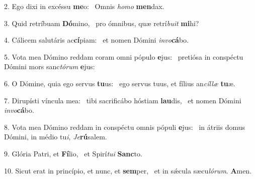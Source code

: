 2. Ego dixi in excéssu \textbf{me}o: \ast\  Omnis \textit{ho}\textit{mo} \textbf{men}dax.\

3. Quid retríbuam \textbf{Dó}mino, \ast\  pro ómnibus, quæ retrí\textit{bu}\textit{it} \textbf{mi}hi?\

4. Cálicem salutáris ac\textbf{cí}piam: \ast\  et nomen Dómini \textit{in}\textit{vo}\textbf{cá}bo.\

5. Vota mea Dómino reddam coram omni pópulo \textbf{e}jus: \ast\  pretiósa in conspéctu Dómini mors sanc\textit{tó}\textit{rum} \textbf{e}jus:\

6. O Dómine, quia ego servus \textbf{tu}us: \ast\  ego servus tuus, et fílius an\textit{cíl}\textit{læ} \textbf{tu}æ.\

7. Dirupísti víncula mea: \dag\  tibi sacrificábo hóstiam \textbf{lau}dis, \ast\  et nomen Dómini \textit{in}\textit{vo}\textbf{cá}bo.\

8. Vota mea Dómino reddam in conspéctu omnis pópuli \textbf{e}jus: \ast\  in átriis domus Dómini, in médio tu\textit{i}, \textit{Je}\textbf{rú}salem.\

9. Glória Patri, et \textbf{Fí}lio, \ast\  et Spirí\textit{tu}\textit{i} \textbf{Sanc}to.\

10. Sicut erat in princípio, et nunc, et \textbf{sem}per, \ast\  et in sǽcula sæcu\textit{ló}\textit{rum}. \textbf{A}men.\

